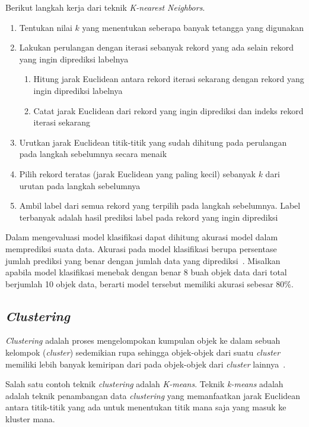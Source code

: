 Berikut langkah kerja dari teknik \textit{K-nearest Neighbors}.
\begin{enumerate}
	\item Tentukan nilai \(k\) yang menentukan seberapa banyak tetangga yang digunakan
	\item Lakukan perulangan dengan iterasi sebanyak rekord yang ada selain rekord yang ingin diprediksi labelnya
	\begin{enumerate}
		\item Hitung jarak Euclidean antara rekord iterasi sekarang dengan rekord yang ingin diprediksi labelnya
		\item Catat jarak Euclidean dari rekord yang ingin diprediksi dan indeks rekord iterasi sekarang
	\end{enumerate}
	\item Urutkan jarak Euclidean titik-titik yang sudah dihitung pada perulangan pada langkah sebelumnya secara menaik
	\item Pilih rekord teratas (jarak Euclidean yang paling kecil) sebanyak \(k\) dari urutan pada langkah sebelumnya
	\item Ambil label dari semua rekord yang terpilih pada langkah sebelumnya. Label terbanyak adalah hasil prediksi label pada rekord yang ingin diprediksi
\end{enumerate}

Dalam mengevaluasi model klasifikasi dapat dihitung akurasi model dalam memprediksi suata data. Akurasi pada model klasifikasi berupa persentase jumlah prediksi yang benar dengan jumlah data yang diprediksi~\cite{jiawei:12:datmin}. Misalkan apabila model klasifikasi menebak dengan benar 8 buah objek data dari total berjumlah 10 objek data, berarti model tersebut memiliki akurasi sebesar 80\%.

\subsection{\textit{Clustering}}
\label{subsec:clustering}

\textit{Clustering} adalah proses mengelompokan kumpulan objek ke dalam sebuah kelompok (\textit{cluster}) sedemikian rupa sehingga objek-objek dari suatu \textit{cluster} memiliki lebih banyak kemiripan dari pada objek-objek dari \textit{cluster} lainnya~\cite{mendes:17:ppdmieee}. 

Salah satu contoh teknik \textit{clustering} adalah \textit{K-means}. Teknik \textit{k-means} adalah adalah teknik penambangan data \textit{clustering} yang memanfaatkan jarak Euclidean antara titik-titik yang ada untuk menentukan titik mana saja yang masuk ke kluster mana.


